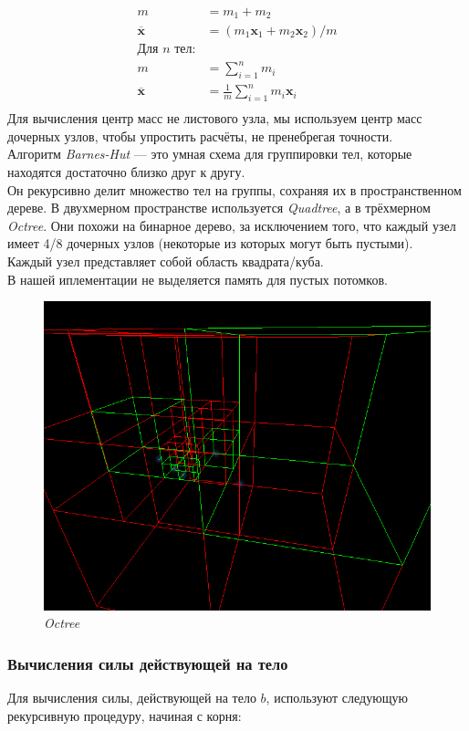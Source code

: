 \documentclass{article}
\begin{document}
\begin{align*}
  m &= m_1 + m_2\\
  \overline{\mathbf{x}} &= (m_1\mathbf{x}_1 + m_2\mathbf{x}_2) / m\\
  \text{Для $n$ тел:}&\\
  m &= \sum^{n}_{i = 1}{m_i}\\
  \overline{\mathbf{x}} &= \frac{1}{m}\sum^{n}_{i = 1}{m_i\mathbf{x}_i}\\
\end{align*}
Для вычисления центр масс не листового узла, мы используем центр масс дочерных узлов, чтобы упростить расчёты, не пренебрегая точности.\\[\baselineskip]
Алгоритм \textit{Barnes-Hut} --- это умная схема для группировки тел, которые находятся достаточно близко друг к другу.\\
Он рекурсивно делит множество тел на группы, сохраняя их в пространственном дереве.
В двухмерном пространстве используется \textit{Quadtree}, а в трёхмерном \textit{Octree}. Они похожи на бинарное дерево, за исключением того, что каждый узел имеет 4/8 дочерных узлов (некоторые из которых могут быть пустыми).\\
Каждый узел представляет собой область квадрата/куба.\\
В нашей иплементации не выделяется память для пустых потомков.\\

\begin{figure}[H]
  \centering
  \includegraphics[width=0.7\linewidth]{../images/octree2.png}
  \caption{\textit{Octree}}
  \label{fig:octree}
\end{figure}

\subsubsection*{Вычисления силы действующей на тело}
Для вычисления силы, действующей на тело $b$, используют следующую рекурсивную процедуру, начиная с корня:
\end{document}
